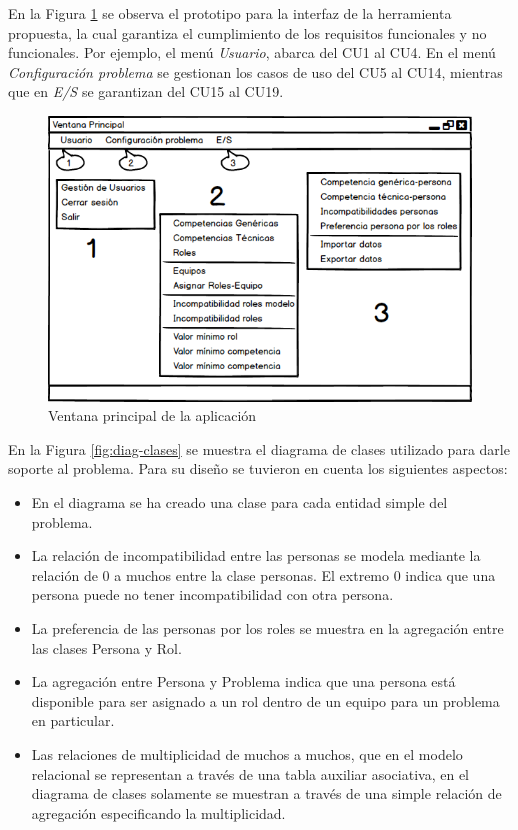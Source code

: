 
En la Figura \ref{fig:pantalla-principal} se observa el prototipo para la interfaz de la herramienta propuesta, la cual garantiza el cumplimiento de los requisitos funcionales y no funcionales. Por ejemplo, el menú \textit{Usuario}, abarca del CU1 al CU4. En el menú \textit{Configuración problema} se gestionan los casos de uso del CU5 al CU14, mientras que en \textit{E/S} se garantizan del CU15 al CU19.

\begin{figure}[H]
	\centering
	\includegraphics[width=1\textwidth]{figuras/VentanaPrincipal.png}
	\caption{Ventana principal de la aplicación}\label{fig:pantalla-principal}
\end{figure}


En la Figura \ref{fig:diag-clases} se muestra el diagrama de clases utilizado para darle soporte al problema. Para su diseño se tuvieron en cuenta los siguientes aspectos:
\begin{itemize}
	\item En el diagrama se ha creado una clase para cada entidad simple del problema.
	\item La relación de incompatibilidad entre las personas se modela mediante la relación de 0 a muchos entre la clase personas. El extremo 0 indica que una persona puede no tener incompatibilidad con otra persona.
	\item La preferencia de las personas por los roles se muestra en la agregación entre las clases Persona y Rol.
	\item La agregación entre Persona y Problema indica que una persona está disponible para ser asignado a un rol dentro de un equipo para un problema en particular.
	\item Las relaciones de multiplicidad de muchos a muchos, que en el modelo relacional se representan a través de una tabla auxiliar asociativa, en el diagrama de clases solamente se muestran a través de una simple relación de agregación especificando la multiplicidad.
\end{itemize}

